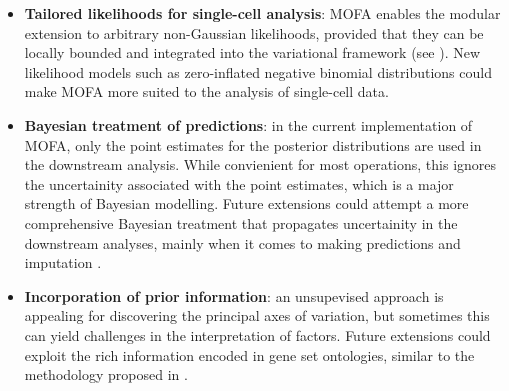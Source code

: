 \begin{itemize}
	\item \textbf{Tailored likelihoods for single-cell analysis}: MOFA enables the modular extension to arbitrary non-Gaussian likelihoods, provided that they can be locally bounded and integrated into the variational framework (see ). New likelihood models such as zero-inflated negative binomial distributions \cite{Risso2018} could make MOFA more suited to the analysis of single-cell data.

	\item \textbf{Bayesian treatment of predictions}: in the current implementation of MOFA, only the point estimates for the posterior distributions are used in the downstream analysis. While convienient for most operations, this ignores the uncertainity associated with the point estimates, which is a major strength of Bayesian modelling. Future extensions could attempt a more comprehensive Bayesian treatment that propagates uncertainity in the downstream analyses, mainly when it comes to making predictions and imputation \cite{Gelman2013}.

	\item \textbf{Incorporation of prior information}: an unsupevised approach is appealing for discovering the principal axes of variation, but sometimes this can yield challenges in the interpretation of factors. Future extensions could exploit the rich information encoded in gene set ontologies, similar to the methodology proposed in \cite{Buettner2017}.

\end{itemize}

